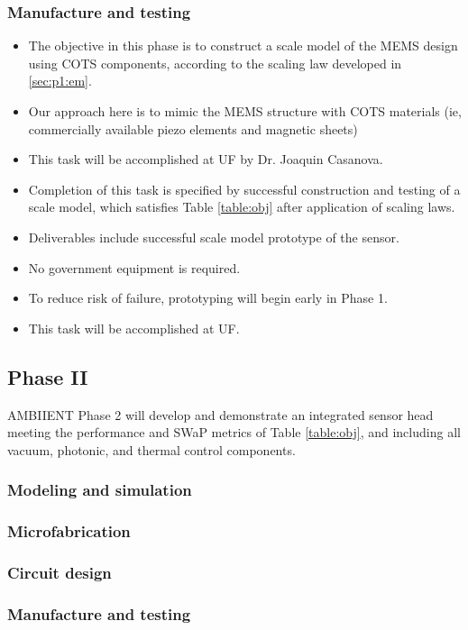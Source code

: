 \subsubsection{Manufacture and testing}
\begin{itemize}
\item The objective in this phase is to construct a scale model of the MEMS design using COTS components, according to the scaling law developed in \ref{sec:p1:em}.
\item Our approach here is to mimic the MEMS structure with COTS materials (ie, commercially available piezo elements and magnetic sheets)
\item This task will be accomplished at UF by Dr. Joaquin Casanova.
\item Completion of this task is specified by successful construction and testing of a scale model, which satisfies Table \ref{table:obj} after application of scaling laws.
\item Deliverables include successful scale model prototype of the sensor.
\item No government equipment is required.
\item To reduce risk of failure, prototyping will begin early in Phase 1.
\item This task will be accomplished at UF.
\end{itemize}
\subsection{Phase II}
  
AMBIIENT Phase 2 will develop and demonstrate an integrated sensor head meeting the
performance and SWaP metrics of Table \ref{table:obj}, and including all vacuum, photonic, and thermal
control components.

\subsubsection{Modeling and simulation}
\subsubsection{Microfabrication}
\subsubsection{Circuit design}
\subsubsection{Manufacture and testing}
